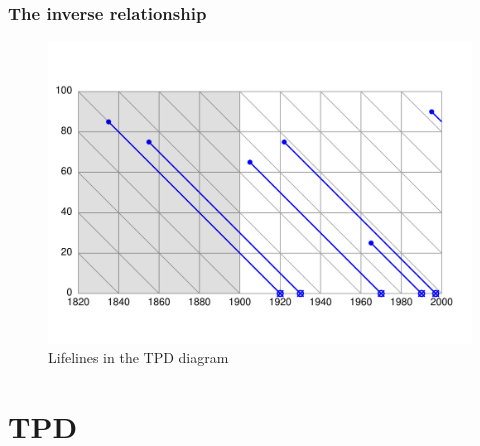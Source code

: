 \documentclass[20pt]{beamer}
\begin{document}
\begin{frame}
\frametitle{The inverse relationship}
\begin{figure}[b]
    \centering
    \includegraphics[scale=.7]{Figures/LabPres/TPD2.pdf}
    \caption{Lifelines in the TPD diagram}
\end{figure} 
\end{frame}

\section{TPD}
\end{document}
